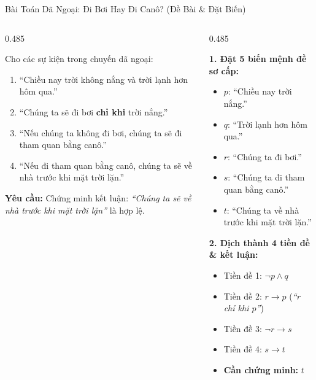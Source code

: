 \documentclass[aspectratio=169, 10pt]{beamer}
\begin{document}
\begin{frame}{Bài Toán Dã Ngoại: Đi Bơi Hay Đi Canô? (Đề Bài \& Đặt Biến)}
  \begin{columns}[t, onlytextwidth]
    \begin{column}{0.485\textwidth}
      \begin{cozyDef}
        \small
        Cho các sự kiện trong chuyến dã ngoại:
        \begin{enumerate}
          \setlength{\itemsep}{0.5pt}
          \item ``Chiều nay trời không nắng và trời lạnh hơn hôm qua.''
          \item ``Chúng ta sẽ đi bơi \textbf{chỉ khi} trời nắng.''
          \item ``Nếu chúng ta không đi bơi, chúng ta sẽ đi tham quan bằng canô.''
          \item ``Nếu đi tham quan bằng canô, chúng ta sẽ về nhà trước khi mặt trời lặn.''
        \end{enumerate}
        \par\vspace{0.02cm}
        \textbf{Yêu cầu:} Chứng minh kết luận: \textit{``Chúng ta sẽ về nhà trước khi mặt trời lặn''} là hợp lệ.
      \end{cozyDef}
    \end{column}
    \begin{column}{0.485\textwidth}
      \begin{cozyMethod}
        \footnotesize
        \textbf{1. Đặt 5 biến mệnh đề sơ cấp:}
        \begin{itemize}
          \setlength{\itemsep}{0.3pt}
          \item $p$: ``Chiều nay trời nắng.''
          \item $q$: ``Trời lạnh hơn hôm qua.''
          \item $r$: ``Chúng ta đi bơi.''
          \item $s$: ``Chúng ta đi tham quan bằng canô.''
          \item $t$: ``Chúng ta về nhà trước khi mặt trời lặn.''
        \end{itemize}
        \textbf{2. Dịch thành 4 tiền đề \& kết luận:}
        \begin{itemize}
          \setlength{\itemsep}{0.3pt}
          \item Tiền đề 1: $\neg p \land q$
          \item Tiền đề 2: $r \to p$ (\textit{``$r$ chỉ khi $p$''})
          \item Tiền đề 3: $\neg r \to s$
          \item Tiền đề 4: $s \to t$
          \item \textbf{Cần chứng minh:} $t$
        \end{itemize}
      \end{cozyMethod}
    \end{column}
  \end{columns}
\end{frame}
\end{document}

